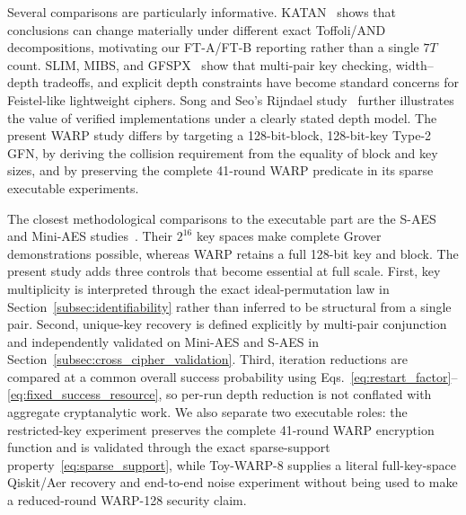 \documentclass[10pt,a4paper]{article}
\begin{document}
Several comparisons are particularly informative. KATAN~\cite{Rahman2022} shows that conclusions can change materially under different exact Toffoli/AND decompositions, motivating our FT-A/FT-B reporting rather than a single $7T$ count. SLIM, MIBS, and GFSPX~\cite{SLIM2025,MIBS2026,Ulgen2026} show that multi-pair key checking, width--depth tradeoffs, and explicit depth constraints have become standard concerns for Feistel-like lightweight ciphers. Song and Seo's Rijndael study~\cite{SongSeo2026} further illustrates the value of verified implementations under a clearly stated depth model. The present WARP study differs by targeting a 128-bit-block, 128-bit-key Type-2 GFN, by deriving the collision requirement from the equality of block and key sizes, and by preserving the complete 41-round WARP predicate in its sparse executable experiments.

The closest methodological comparisons to the executable part are the S-AES and Mini-AES studies~\cite{Wang2025,Kiran2026}.  Their $2^{16}$ key spaces make complete Grover demonstrations possible, whereas WARP retains a full 128-bit key and block.  The present study adds three controls that become essential at full scale.  First, key multiplicity is interpreted through the exact ideal-permutation law in Section~\ref{subsec:identifiability} rather than inferred to be structural from a single pair.  Second, unique-key recovery is defined explicitly by multi-pair conjunction and independently validated on Mini-AES and S-AES in Section~\ref{subsec:cross_cipher_validation}.  Third, iteration reductions are compared at a common overall success probability using Eqs.~\eqref{eq:restart_factor}--\eqref{eq:fixed_success_resource}, so per-run depth reduction is not conflated with aggregate cryptanalytic work.  We also separate two executable roles: the restricted-key experiment preserves the complete 41-round WARP encryption function and is validated through the exact sparse-support property~\eqref{eq:sparse_support}, while Toy-WARP-8 supplies a literal full-key-space Qiskit/Aer recovery and end-to-end noise experiment without being used to make a reduced-round WARP-128 security claim.
\end{document}
